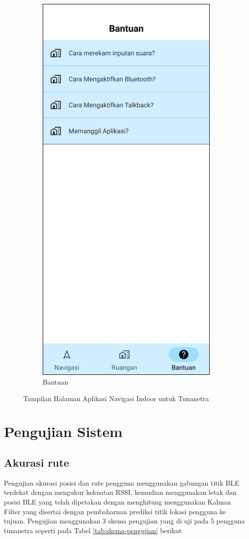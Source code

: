 \begin{enumerate}
\begin{figure} [H]
\begin{subfigure}{.5\textwidth}
 		\includegraphics[width=.5\linewidth]{gambar/bab4/bantuan} 
 		\caption{Bantuan}
	\end{subfigure}
		\vspace{0.5cm}
		\caption{Tampilan Halaman Aplikasi Navigasi Indoor untuk Tunanetra}
	\label{aplikasimappingbagian1}
	\end{figure}

\end{enumerate}

\section{Pengujian Sistem}
\subsection{Akurasi rute}
\par Pengujian akurasi posisi dan rute pengguna menggunakan gabungan titik BLE terdekat dengan mengukur kekuatan RSSI, kemudian menggunakan letak dan posisi BLE yang telah dipetakan dengan menghitung menggunakan Kalman Filter yang disertai dengan pembaharuan prediksi titik lokasi pengguna ke tujuan.
Pengujian menggunakan 3 skema pengujian yang di uji pada 5 pengguna tunanetra seperti pada Tabel \ref{tab:skema-pengujian} berikut




